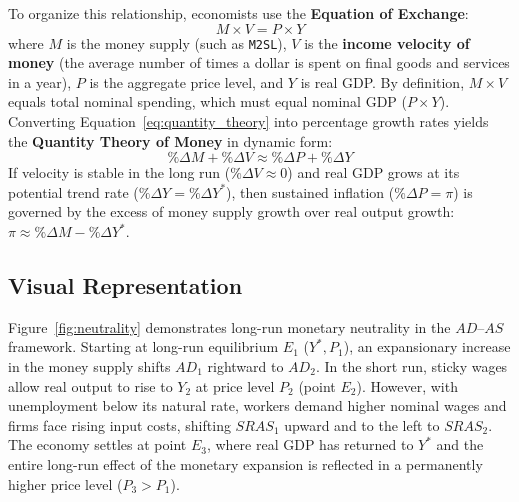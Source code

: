 \documentclass[11pt, a4paper]{article}
\begin{document}
To organize this relationship, economists use the \textbf{Equation of Exchange}:
\begin{equation}
  M \times V = P \times Y
  \label{eq:quantity_theory}
\end{equation}
where $M$ is the money supply (such as \texttt{M2SL}), $V$ is the \textbf{income velocity of money} (the average number of times a dollar is spent on final goods and services in a year), $P$ is the aggregate price level, and $Y$ is real GDP. By definition, $M \times V$ equals total nominal spending, which must equal nominal GDP ($P \times Y$). Converting Equation~\eqref{eq:quantity_theory} into percentage growth rates yields the \textbf{Quantity Theory of Money} in dynamic form:
\begin{equation}
  \%\Delta M + \%\Delta V \approx \%\Delta P + \%\Delta Y
  \label{eq:quantity_growth}
\end{equation}
If velocity is stable in the long run ($\%\Delta V \approx 0$) and real GDP grows at its potential trend rate ($\%\Delta Y = \%\Delta Y^*$), then sustained inflation ($\%\Delta P = \pi$) is governed by the excess of money supply growth over real output growth: $\pi \approx \%\Delta M - \%\Delta Y^*$.

\subsection*{Visual Representation}
Figure~\ref{fig:neutrality} demonstrates long-run monetary neutrality in the $AD\text{--}AS$ framework. Starting at long-run equilibrium $E_1$ ($Y^*, P_1$), an expansionary increase in the money supply shifts $AD_1$ rightward to $AD_2$. In the short run, sticky wages allow real output to rise to $Y_2$ at price level $P_2$ (point $E_2$). However, with unemployment below its natural rate, workers demand higher nominal wages and firms face rising input costs, shifting $SRAS_1$ upward and to the left to $SRAS_2$. The economy settles at point $E_3$, where real GDP has returned to $Y^*$ and the entire long-run effect of the monetary expansion is reflected in a permanently higher price level ($P_3 > P_1$).
\end{document}
